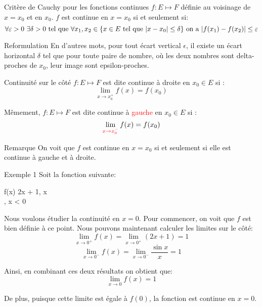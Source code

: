 \documentclass[a4paper]{article}
\begin{document}
\begin{parag}{Critère de Cauchy pour les fonctions continues}
    $f : E \mapsto F$ définie au voisinage de $x = x_0$ et en $x_0$. $f$ est continue en $x = x_0$ si et seulement si: 
    \[\forall \epsilon > 0 \ \exists \delta > 0 \telque \forall x_1, x_2 \in \left\{x \in E \telque \left|x - x_0\right| \leq \delta\right\} \text{ on a } \left|f\left(x_1\right) - f\left(x_2\right)\right| \leq \epsilon\]

    \begin{subparag}{Reformulation}
        En d'autres mots, pour tout écart vertical $\epsilon$, il existe un écart horizontal $\delta$ tel que pour toute paire de nombre, où les deux nombres sont delta-proches de $x_0$, leur image sont epsilon-proches. 
    \end{subparag}
\end{parag}

\begin{parag}{Continuité sur le côté}
    $f : E \mapsto F$ est dite continue à droite en $x_0 \in E$ si : 
    \[\lim_{x \to x_0^+} f\left(x\right) = f\left(x_0\right)\]
    
    Mêmement, $f : E \mapsto F$ est dite continue à \textcolor{red}{gauche} en $x_0 \in E$ si : 
    \[\lim_{{\color{red}x \to x_0^-}} f\left(x\right) = f\left(x_0\right)\]

    \begin{subparag}{Remarque}
        On voit que $f$ est continue en $x = x_0$ si et seulement si elle est continue à gauche et à droite.
    \end{subparag}
    
\end{parag}

\begin{parag}{Exemple 1}
    Soit la fonction suivante:
    \begin{functionbypart}{f\left(x\right)}
    2x + 1, \mathspace x  \\
    , \mathspace x < 0
    \end{functionbypart}

    Nous voulons étudier la continuité en $x = 0$. Pour commencer, on voit que $f$ est bien définie à ce point. Nous pouvons maintenant calculer les limites sur le côté: 
    \[\lim_{x \to 0^+} f\left(x\right) = \lim_{x \to 0^+} \left(2x + 1\right) = 1\]
    \[\lim_{x \to 0^-} f\left(x\right) = \lim_{x \to 0^-} \frac{\sin x}{x} = 1\]

    Ainsi, en combinant ces deux résultats on obtient que: 
    \[\lim_{x \to 0} f\left(x\right) = 1\]

    De plus, puisque cette limite est égale à $f\left(0\right)$, la fonction est continue en $x = 0$.
\end{parag}
\end{document}
